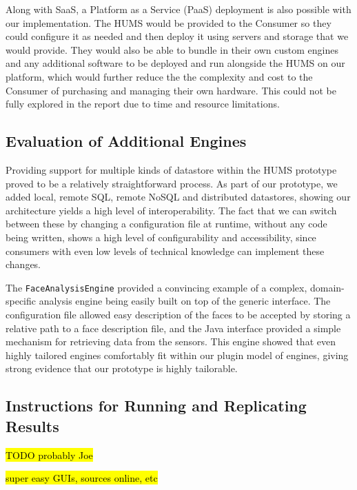 \documentclass[10pt,a4paper]{article}
\begin{document}
Along with SaaS, a Platform as a Service (PaaS) deployment is also possible with our implementation. The HUMS would be provided to the Consumer so they could configure it as needed and then deploy it using servers and storage that we would provide. They would also be able to bundle in their own custom engines and any additional software to be deployed and run alongside the HUMS on our platform, which would further reduce the the complexity and cost to the Consumer of purchasing and managing their own hardware. This could not be fully explored in the report due to time and resource limitations.


\subsection{Evaluation of Additional Engines}
\label{sec:additional}

Providing support for multiple kinds of datastore within the HUMS prototype proved to be a relatively straightforward process. As part of our prototype, we added local, remote SQL, remote NoSQL and distributed datastores, showing our architecture yields a high level of interoperability. The fact that we can switch between these by changing a configuration file at runtime, without any code being written, shows a high level of configurability and accessibility, since consumers with even low levels of technical knowledge can implement these changes.
 
The \texttt{FaceAnalysisEngine} provided a convincing example of a complex, domain-specific analysis engine being easily built on top of the generic interface. The configuration file allowed easy description of the faces to be accepted by storing a relative path to a face description file, and the Java interface provided a simple mechanism for retrieving data from the sensors. This engine showed that even highly tailored engines comfortably fit within our plugin model of engines, giving strong evidence that our prototype is highly tailorable.


\subsection{Instructions for Running and Replicating Results}
\label{sec:instructions}

\hl{TODO probably Joe}

\hl{super easy GUIs, sources online, etc}
\end{document}
